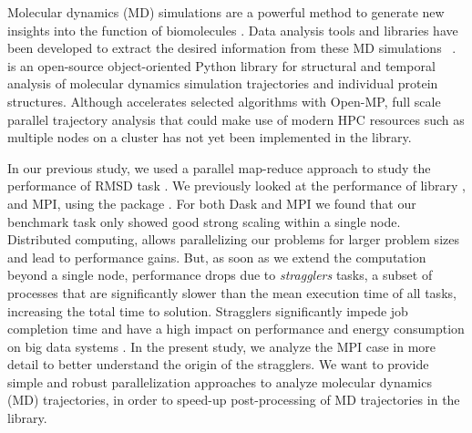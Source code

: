 \label{sec:introduction}
Molecular dynamics (MD) simulations are a powerful method to generate new insights into the function of biomolecules \citep{Borhani:2012mi, Dror:2012cr, Orozco:2014dq, Perilla:2015kx, Bottaro:2018aa}.  Data analysis tools and libraries have been developed to extract the desired information from these MD simulations ~\cite{nmoldyn, nmoldyn-2012, Hum96, Hinsen:2000kx, Grant:2006ud, himach-2008, Romo:2009zr, Romo:2014bh, Michaud-Agrawal:2011fu, Gowers:2016aa, cpptraj-2013, mdtraj-2015, pteros2015, Doerr:2016aa}.    \citep{Gowers:2016aa,Michaud-Agrawal:2011fu} is an open-source object-oriented Python library for structural and temporal analysis of molecular dynamics simulation trajectories and individual protein structures.  Although  accelerates selected algorithms with Open-MP, full scale parallel trajectory analysis that could make use of modern HPC resources such as multiple nodes on a cluster has not yet been implemented in the library.

In our previous study, we used a parallel map-reduce approach to study the performance of RMSD task \cite{Khoshlessan:2017ab, ICCP-2018}. 
We previously looked at the performance of  library \cite{Rocklin:2015aa}, and MPI, using the  package \cite{Dalcin:2011aa, Dalcin:2005aa}. 
For both Dask and MPI we found that our benchmark task only showed good strong scaling within a single node.
Distributed computing, allows parallelizing our problems for larger problem sizes and lead to performance gains.
But, as soon as we extend the computation beyond a single node, performance drops due to \emph{stragglers} tasks, a subset of processes that are significantly slower than the mean execution time of all tasks, increasing the total time to solution.
Stragglers significantly impede job completion time \cite{Garraghan2016} and have a high impact on performance and energy consumption on big data systems \cite{Tien-2017}.
In the present study, we analyze the MPI case in more detail to better understand the origin of the stragglers.
We want to provide simple and robust parallelization approaches to analyze molecular dynamics (MD) trajectories, in order to speed-up post-processing of MD trajectories in the  library. 

